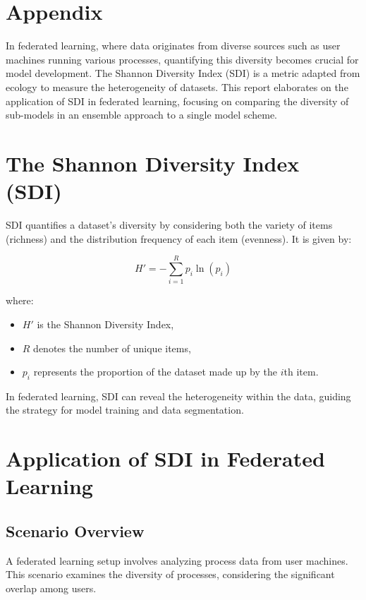 \section{Appendix}
\label{sub:hyper}

In  federated learning, where data originates from diverse sources such as user machines running various processes, quantifying this diversity becomes crucial for model development. The Shannon Diversity Index (SDI) is a metric adapted from ecology to measure the heterogeneity of datasets. This report elaborates on the application of SDI in federated learning, focusing on comparing the diversity of sub-models in an ensemble approach to a single model scheme.

\section*{The Shannon Diversity Index (SDI)}

SDI quantifies a dataset's diversity by considering both the variety of items (richness) and the distribution frequency of each item (evenness). It is given by:

\[
H' = -\sum_{i=1}^{R} p_i \ln(p_i)
\]

where:
\begin{itemize}
    \item $H'$ is the Shannon Diversity Index,
    \item $R$ denotes the number of unique items,
    \item $p_i$ represents the proportion of the dataset made up by the $i$th item.
\end{itemize}

In federated learning, SDI can reveal the heterogeneity within the data, guiding the strategy for model training and data segmentation.

\section*{Application of SDI in Federated Learning}

\subsection*{Scenario Overview}

A federated learning setup involves analyzing process data from user machines. This scenario examines the diversity of processes, considering the significant overlap among users.

